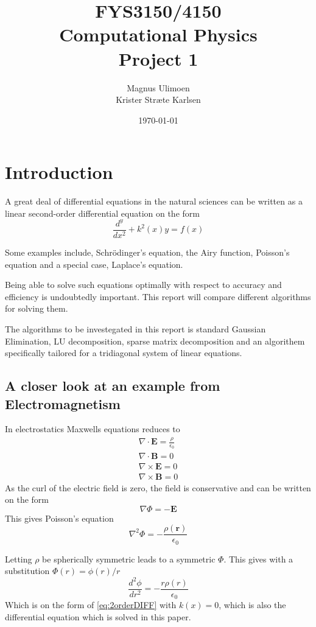\documentclass[11pt,a4paper,english,final]{article}
\title{FYS3150/4150\\Computational Physics\\Project 1}
\author{Magnus Ulimoen\\Krister Stræte Karlsen}
\date{\today}
\numberwithin{equation}{section}
\newcommand{\ve}[1]{\mathbf{#1}} %
\begin{document}
\maketitle

\section{Introduction}

A great deal of differential equations in the natural sciences can be written 
as a linear second-order differential equation on the form
\begin{equation}
\frac{d^y}{dx^2} + k^2(x)y = f(x)
\label{eq:2orderDIFF}
\end{equation}


Some examples include, Schrödinger's equation, the Airy function,
Poisson's equation and a special case, Laplace's equation.

Being able to solve such equations optimally with respect to accuracy 
and efficiency is undoubtedly important. This report will compare 
different algorithms for solving them.

The algorithms to be investegated in this report is standard Gaussian 
Elimination, LU decomposition, sparse matrix decomposition and an 
algorithem specifically tailored for a tridiagonal system of 
linear equations. 


\subsection{A closer look at an example from Electromagnetism}

In electrostatics Maxwells equations reduces to
\begin{gather}
\nabla \cdot \ve{E} = \frac{\rho}{\epsilon_0}\\
\nabla \cdot \ve{B} = 0\\
\nabla \times \ve{E} = 0\\
\nabla \times \ve{B} = 0
\end{gather}
As the curl of the electric field is zero, the field is conservative
and can be written on the form
\begin{equation}
\nabla \Phi = -\ve{E}
\end{equation}
This gives Poisson's equation
\begin{equation}
\nabla^2\Phi = -\frac{\rho(\ve{r})}{\epsilon_0}
\end{equation}

Letting $\rho$ be spherically symmetric leads to a symmetric $\Phi$.
This gives with a substitution $\Phi(r) = \phi(r)/r$
\begin{equation}
\frac{d^2\phi}{dr^2} = -\frac{r\rho(r)}{\epsilon_0}
\end{equation}
Which is on the form of \eqref{eq:2orderDIFF} with $k(x)=0$, which is also the differential
equation which is solved in this paper.
\end{document}
